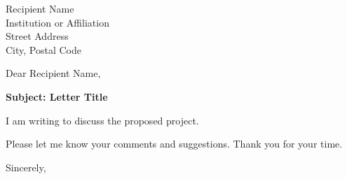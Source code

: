\documentclass[11pt,a4paper]{letter}
\date{\today}
\begin{document}
\begin{letter}{Recipient Name\\Institution or Affiliation\\Street Address\\City, Postal Code}
\opening{Dear Recipient Name,}

\textbf{Subject: Letter Title}

I am writing to discuss the proposed project.

Please let me know your comments and suggestions. Thank you for your time.

\closing{Sincerely,}
\end{letter}
\end{document}

